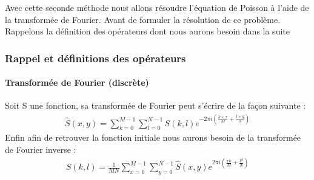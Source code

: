 Avec cette seconde méthode nous allons résoudre l'équation de Poisson à l'aide de la transformée de Fourier. Avant de formuler la résolution de ce problème. Rappelons la définition des opérateurs dont nous aurons besoin dans la suite
\subsubsection{Rappel et définitions des opérateurs}
\paragraph{Transformée de Fourier (discrète)}
Soit S une fonction, sa transformée de Fourier peut s'écrire de la façon suivante : 
\begin{equation}
\begin{aligned}
\widehat{S}(x,y) = \sum_{k = 0}^{M-1} \sum_{l = 0}^{N-1} S(k,l) e^{-2\pi i\left(\frac{k\times x}{M}+\frac{l\times y}{N}\right)}
\end{aligned}
\end{equation}
Enfin afin de retrouver la fonction initiale nous aurons besoin de la transformée de Fourier inverse : 
\begin{equation}
\begin{aligned}
S(k,l) = \frac{1}{MN} \sum_{x = 0}^{M-1} \sum_{y = 0}^{N-1} \hat{S}(x,y) e^{2\pi i \left(\frac{xk}{M}+\frac{yl}{N}\right)}
\end{aligned}
\end{equation}
